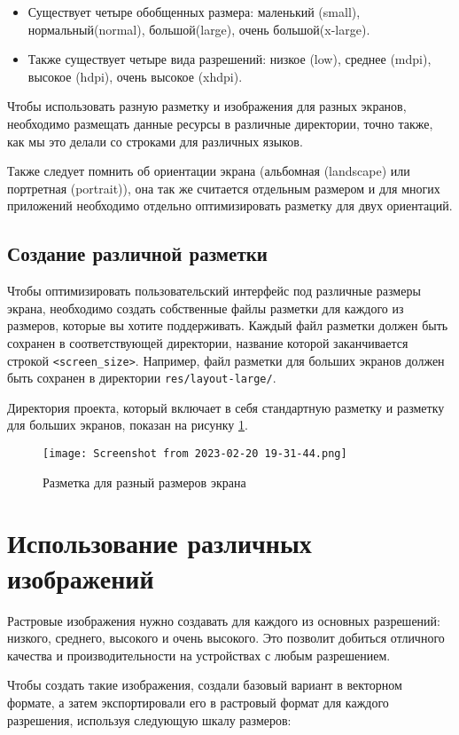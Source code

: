 \begin{itemize}
	\item Существует четыре обобщенных размера: маленький (small),
		нормальный(normal), большой(large), очень большой(x-large).
	\item Также существует четыре вида разрешений: низкое (low), среднее
		(mdpi), высокое (hdpi), очень высокое (xhdpi).
\end{itemize}

Чтобы использовать разную разметку и изображения для разных экранов,
необходимо размещать данные ресурсы в различные директории, точно
также, как мы это делали со строками для различных языков.\par
Также следует помнить об ориентации экрана (альбомная (landscape) или
портретная (portrait)), она так же считается отдельным размером и для
многих приложений необходимо отдельно оптимизировать разметку для
двух ориентаций.

\subsection{Создание различной разметки}
Чтобы оптимизировать пользовательский интерфейс под различные размеры
экрана, необходимо создать собственные файлы разметки для каждого из
размеров, которые вы хотите поддерживать. Каждый файл разметки должен
быть сохранен в соответствующей директории, название которой
заканчивается строкой \texttt{<screen\_size>}. Например, файл разметки для
больших экранов должен быть сохранен в директории \texttt{res/layout-large/}.

Директория проекта, который включает в себя стандартную разметку и разметку
для больших экранов, показан на рисунку \ref{fig:res:layout}.
\begin{figure}[h!tp]
	\centering
	\texttt{[image: Screenshot from 2023-02-20 19-31-44.png]}
	\caption{Разметка для разный размеров экрана}
	\label{fig:res:layout}
\end{figure}

\section{Использование различных изображений}
Растровые изображения нужно создавать для каждого из основных
разрешений: низкого, среднего, высокого и очень высокого. Это позволит
добиться отличного качества и производительности на устройствах с любым
разрешением.\par
Чтобы создать такие изображения, создали базовый вариант в векторном
формате, а затем экспортировали его в растровый формат для каждого
разрешения, используя следующую шкалу размеров:

